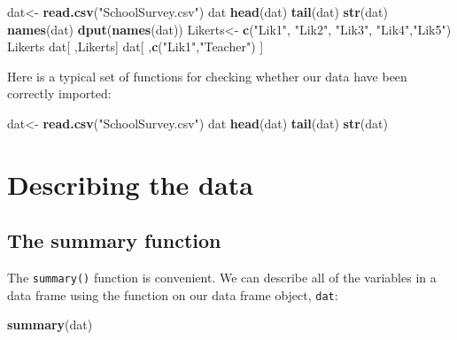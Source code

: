 \documentclass[
]{article}
\newenvironment{Shaded}{\begin{snugshade}}{\end{snugshade}}
\newcommand{\KeywordTok}[1]{\textcolor[rgb]{0.13,0.29,0.53}{\textbf{#1}}}
\newcommand{\NormalTok}[1]{#1}
\newcommand{\StringTok}[1]{\textcolor[rgb]{0.31,0.60,0.02}{#1}}
\begin{document}
\begin{Shaded}
\begin{Highlighting}[]
\NormalTok{dat<-}\StringTok{ }\KeywordTok{read.csv}\NormalTok{(}\StringTok{"SchoolSurvey.csv"}\NormalTok{)}
\NormalTok{dat}
\KeywordTok{head}\NormalTok{(dat)}
\KeywordTok{tail}\NormalTok{(dat)}
\KeywordTok{str}\NormalTok{(dat)}
\KeywordTok{names}\NormalTok{(dat)}
\KeywordTok{dput}\NormalTok{(}\KeywordTok{names}\NormalTok{(dat))}
\NormalTok{Likerts<-}\StringTok{ }\KeywordTok{c}\NormalTok{(}\StringTok{"Lik1"}\NormalTok{, }\StringTok{"Lik2"}\NormalTok{, }\StringTok{"Lik3"}\NormalTok{, }\StringTok{"Lik4"}\NormalTok{,}\StringTok{"Lik5"}\NormalTok{)}
\NormalTok{Likerts}
\NormalTok{dat[ ,Likerts]}
\NormalTok{dat[ ,}\KeywordTok{c}\NormalTok{(}\StringTok{"Lik1"}\NormalTok{,}\StringTok{"Teacher"}\NormalTok{) ]}
\end{Highlighting}
\end{Shaded}

Here is a typical set of functions for checking whether our data have been correctly imported:

\begin{Shaded}
\begin{Highlighting}[]
\NormalTok{dat<-}\StringTok{ }\KeywordTok{read.csv}\NormalTok{(}\StringTok{"SchoolSurvey.csv"}\NormalTok{)}
\NormalTok{dat}
\KeywordTok{head}\NormalTok{(dat)}
\KeywordTok{tail}\NormalTok{(dat)}
\KeywordTok{str}\NormalTok{(dat)}
\end{Highlighting}
\end{Shaded}

\hypertarget{describing}{%
\section{Describing the data}\label{describing}}

\hypertarget{the-summary-function}{%
\subsection{The summary function}\label{the-summary-function}}

The \texttt{summary()} function is convenient. We can describe all of the variables in a data frame using the function on our data frame object, \texttt{dat}:

\begin{Shaded}
\begin{Highlighting}[]
\KeywordTok{summary}\NormalTok{(dat)}
\end{Highlighting}
\end{Shaded}
\end{document}
